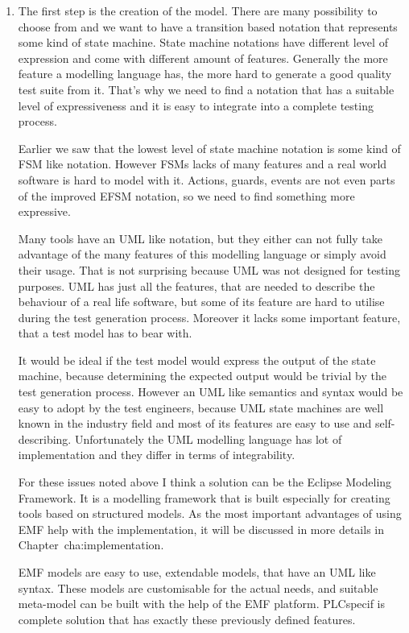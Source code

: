 \begin{enumerate}

\item The first step is the creation of the model. There are many possibility to choose from and we want to have a transition based notation that represents some kind of state machine. State machine notations have different level of expression and come with different amount of features. Generally the more feature a modelling language has, the more hard to generate a good quality test suite from it. That's why we need to find a notation that has a suitable level of expressiveness and it is easy to integrate into a complete testing process.

Earlier we saw that the lowest level of state machine notation is some kind of FSM like notation. However FSMs lacks of many features and a real world software is hard to model with it. Actions, guards, events are not even parts of the improved EFSM notation, so we need to find something more expressive.

Many tools have an UML like notation, but they either can not fully take advantage of the many features of this modelling language or simply avoid their usage. That is not surprising because UML was not designed for testing purposes. UML has just all the features, that are needed to describe the behaviour of a real life software, but some of its feature are hard to utilise during the test generation process. Moreover it lacks some important feature, that a test model has to bear with.

It would be ideal if the test model would express the output of the state machine, because determining the expected output would be trivial by the test generation process. However an UML like semantics and syntax would be easy to adopt by the test engineers, because UML state machines are well known in the industry field and most of its features are easy to use and self-describing. Unfortunately the UML modelling language has lot of implementation and they differ in terms of integrability.

For these issues noted above I think a solution can be the Eclipse Modeling Framework. It is a modelling framework that is built especially for creating tools based on structured models. As the most important advantages of using EMF help with the implementation, it will be discussed in more details in Chapter~{cha:implementation}.

EMF models are easy to use, extendable models, that have an UML like syntax.  These models are customisable for the actual needs, and suitable meta-model can be built with the help of the EMF platform. PLCspecif is complete solution that has exactly these previously defined features.


\end{enumerate}
